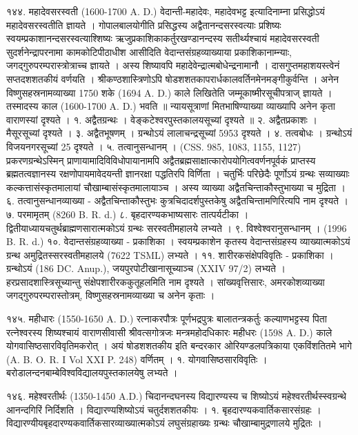 १४४. महादेवसरस्वती (1600-1700 A. D.)
वेदान्ती-महादेवः, महादेवभट्ट इत्यादिनाम्ना प्रसिद्धोऽयं महादेवसरस्वतीति ज्ञायते । गोपालबालयोगीति प्रसिद्धस्य अद्वैतानन्दसरस्वत्याः प्रशिष्यः स्वयम्प्रकाशानन्दसरस्वत्याश्शिष्यः ऋजुप्रकाशिकाकर्तुरखण्डानन्दस्य सतीर्थ्यश्चायं महादेवसरस्वती सुदर्शनेन्द्रापरनामा कामकोटिपीठाधीश आसीदिति वेदान्तसंग्रहव्याख्याया प्रकाशिकानाम्न्याः, जगद्गुरुपरम्परास्त्रोत्राच्च ज्ञायते । अस्य शिष्यावपि महादेवेन्द्रात्मबोधेन्द्रनामानौ । दासगुप्तमहाशयस्त्वेनं सप्तदशशतकीयं वर्णयति । श्रीकण्ठशास्त्रिणोऽपि षोडशशतकापरार्धकालवर्तिनमेनमङ्गीकुर्वन्ति । अनेन विष्णुसहस्रनामव्याख्या 1750 शके (1694 A. D.) काले लिखितेति जम्मूकाष्मीरसूचीपत्राज् ज्ञायते । तस्मादस्य काल (1600-1700 A. D.) भवति ॥ न्यायसूत्राणां मितभाषिण्याख्या व्याख्यापि अनेन कृता वाराणस्यां दृश्यते ।
१. अद्वैतग्रन्थः । वेङ्कटेश्वरपुस्तकालयसूच्यां दृश्यते ॥
२. अद्वैतप्रकाशः । मैसूरसूच्यां दृश्यते ।
३. अद्वैतभूषणम् । ग्रन्थोऽयं लालाचन्द्रसूच्यां 5953 दृश्यते ।
४. तत्वबोधः । ग्रन्थोऽयं विजयनगरसूच्यां 25 दृश्यते ।
५. तत्वानुसन्धानम् । (CSS. 985, 1083, 1155, 1127)
प्रकरणग्रन्थेऽस्मिन् प्राणायामादिविविधोपायानामपि अद्वैतब्रह्मसाक्षात्कारोपयोगित्ववर्णनपूर्वकं प्राप्तस्य ब्रह्मतत्वज्ञानस्य रक्षणोपायमावेदयन्ती ज्ञानरक्षा पद्धतिरपि विर्णिता । चतुर्भिः परिछेदैः पूर्णोऽयं ग्रन्थः सव्याख्याः कल्कत्तासंस्कृतमालायां चौखाम्बासंस्कृतमालायाञ्च । अस्य व्याख्या अद्वैतचिन्ताकौस्तुभाख्या च मुद्रिता ।
६. तत्वानुसन्धानव्याख्या - अद्वैतचिन्ताकौस्तुभः 
कुत्रचिदादर्शपुस्तकेषु अद्वैतचिन्तामणिरित्यपि नाम दृश्यते ।
७. परमामृतम् (8260 B. R. d.)
८. बृहदारण्यकभाष्यसारः तात्पर्यटीका । द्वितीयाध्यायचतुर्थब्राह्मणसारात्मकोऽयं ग्रन्थः सरस्वतीमहालये लभ्यते ।
९. विश्वेश्वरानुसन्धानम् । (1996 B. R. d.)
१०. वेदान्तसंग्रहव्याख्या - प्रकाशिका । स्वयम्प्रकाशेन कृतस्य वेदान्तसंग्रहस्य व्याख्यात्मकोऽयं ग्रन्थ अमुद्रितस्सरस्वतीमहालये (7622 TSML) लभ्यते ।
११. शारीरकसंक्षेपविवृतिः - प्रकाशिका । ग्रन्थोऽयं (186 DC. Anup.), जयपुरपोटीखानासूच्याञ्च (XXIV 97/2) लभ्यते । हरप्रसादशास्त्रिसूच्यान्तु संक्षेपशारीरककुतूहलमिति नाम दृश्यते । सांख्यवृत्तिसारः, अमरकोशव्याख्या जगद्गुरुपरम्परास्तोत्रम्, विष्णुसहस्रनामव्याख्या च अनेन कृताः ।

१४५. महीधारः (1550-1650 A. D.)
रत्नाकरपौत्रः पूर्णभद्रपुत्रः बालातन्त्रकर्तुः कल्याणभट्टस्य पिता रत्नेश्वरस्य शिष्यश्चायं वाराणसीवासी श्रीवत्सगोत्रजः मन्त्रमहोदधिकारः महीधरः (1598 A. D.) काले योगवासिष्ठसारविवृतिमकरोत् । अयं षोडशशतकीय इति बन्दरकार ओरियण्डलपत्रिकाया एकविंशतितमे भागे (A. B. O. R. I Vol XXI P. 248) वर्णितम् ।
१. योगवासिष्ठसारविवृतिः । बरोडालन्दनबाम्बेविश्वविद्यालयपुस्तकालयेषु लभ्यते ।

१४६.
महेश्वरतीर्थः (1350-1450 A.D.)
चिदानन्दघनस्य विद्यारण्यस्य च शिष्योऽयं महेश्वरतीर्थस्स्वग्रन्थे आनन्दगिरिं निर्दिशति । विद्यारण्यशिष्योऽयं चतुर्दशशतकीयः ।
१. बृहदारण्यकवार्तिकसारसंग्रहः । विद्यारण्यीयबृहदारण्यकवार्तिकसारव्याख्यात्मकोऽयं लघुसंग्रहाख्यः ग्रन्थः चौखाम्बामुद्रणालये मुद्रितः ।

